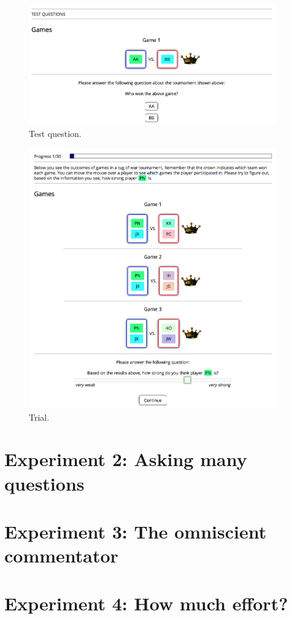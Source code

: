 \documentclass[11pt]{article}
\begin{document}
\begin{figure}[H]
	\centering
	\includegraphics[width=0.95\textwidth]{exp1_screenshot2}
	\caption{Test question.}
	\label{fig:exp1_screenshot2}
\end{figure}

\begin{figure}[H]
	\centering
	\includegraphics[width=0.95\textwidth]{exp1_screenshot3}
	\caption{Trial.}
	\label{fig:exp1_screenshot3}
\end{figure}

\section{Experiment 2: Asking many questions}
\label{sec:experiment_2_asking_many_questions}

\section{Experiment 3: The omniscient commentator}
\label{sec:experiment_3_the_omniscient_commentator}

\section{Experiment 4: How much effort?}
\label{sec:experiment_4_how_much_effort}

\clearpage


\end{document}
